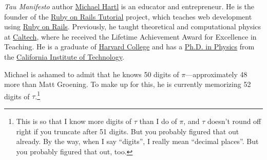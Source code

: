 \documentclass{article}
\begin{document}

\emph{Tau Manifesto} author \href{http://www.michaelhartl.com/}{Michael Hartl} is an educator and entrepreneur. He is the founder of the \href{http://www.railstutorial.org/}{Ruby on Rails Tutorial} project, which teaches web development using \href{http://www.rubyonrails.org/}{Ruby on Rails}. Previously, he taught theoretical and computational physics at  \href{http://www.caltech.edu/}{Caltech}, where he received the Lifetime Achievement Award for Excellence in Teaching. He is a graduate of \href{http://college.harvard.edu/}{Harvard College} and has a \href{http://thesis.library.caltech.edu/1940/}{Ph.D. in Physics} from the \href{http://www.caltech.edu/}{California Institute of Technology}.

Michael is ashamed to admit that he knows 50 digits of $\pi$---approximately 48 more than Matt Groening. To make up for this, he is currently memorizing 52 digits of $\tau$.\footnote{This is so that I know more digits of $\tau$ than I do of $\pi$, and $\tau$ doesn't round off right if you truncate after 51 digits. But you probably figured that out already. By the way, when I say ``digits'', I really mean ``decimal places''. But you probably figured that out, too.}
\end{document}
